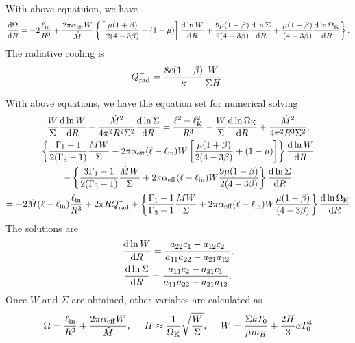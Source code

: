 \documentclass[oneside]{book}
\def\rd{{\rm d}}
\begin{document}
With above equatuion, we have
\begin{gather}
\frac{\rd\Omega}{\rd R}=-2\frac{\ell_{\rm in}}{R^3}+\frac{2\pi\alpha_{\rm eff} W}{\dot M}
\left\{\left[\frac{\mu(1+\beta)}{2(4-3\beta)}+(1-\mu)\right]\frac{\rd\ln W}{\rd R}
+\frac{9\mu(1-\beta)}{2(4-3\beta)}\frac{\rd\ln \Sigma}{\rd R}
+\frac{\mu(1-\beta)}{(4-3\beta)}\frac{\rd\ln \Omega_{\rm K}}{\rd R}
\right\}.
\end{gather}
The radiative cooling is
\begin{equation}
Q_{\rm rad}^-=\frac{8c(1-\beta)}{\kappa}\frac{W}{\Sigma H}.
\end{equation}

With above equations, we have the equation set for numerical solving
\begin{gather}
\frac{W}{\Sigma}\frac{\rd\ln W}{\rd R}-\frac{\dot M^2}{4\pi^2R^2\Sigma^2}\frac{\rd\ln\Sigma}{\rd R}
=\frac{\ell^2-\ell_{\rm K}^2}{R^3}-\frac{W}{\Sigma}\frac{\rd\ln\Omega_{\rm K}}{\rd R}+
\frac{\dot M^2}{4\pi^2R^3\Sigma^2},\\
\left\{ \frac{\Gamma_1+1}{2(\Gamma_3-1)}\frac{\dot MW}{\Sigma}
 -2\pi\alpha_{\rm eff}(\ell-\ell_{\rm in})W\left[\frac{\mu(1+\beta)}{2(4-3\beta)}+(1-\mu)\right]\right\}
\frac{\rd\ln W}{\rd R}\nonumber\\
-\left\{ \frac{3\Gamma_1-1}{2(\Gamma_3-1)}\frac{\dot MW}{\Sigma}
+2\pi\alpha_{\rm eff}(\ell-\ell_{\rm in})W\frac{9\mu(1-\beta)}{2(4-3\beta)}\right\}
\frac{\rd\ln \Sigma}{\rd R}\nonumber\\
=-2\dot M(\ell-\ell_{\rm in})\frac{\ell_{\rm in}}{R^3}+2\pi R Q_{\rm rad}^-
+\left\{\frac{\Gamma_1-1}{\Gamma_3-1}\frac{\dot MW}{\Sigma}
+2\pi\alpha_{\rm eff}(\ell-\ell_{\rm in})W\frac{\mu(1-\beta)}{(4-3\beta)}\right\}
\frac{\rd\ln \Omega_{\rm K}}{\rd R}
\end{gather}
The solutions are
\begin{gather}
\frac{\rd\ln W}{\rd R}=\frac{a_{22}c_1-a_{12}c_2}{a_{11}a_{22}-a_{21}a_{12}},\\
\frac{\rd\ln \Sigma}{\rd R}=\frac{a_{11}c_2-a_{21}c_1}{a_{11}a_{22}-a_{21}a_{12}}.
\end{gather}
Once $W$ and $\Sigma$ are obtained, other variabes are calculated as
\begin{gather}
\Omega=\frac{\ell_{\rm in}}{R^2}+\frac{2\pi\alpha_{\rm eff}W}{\dot M}, ~~~~
H\approx\frac{1}{\Omega_{\rm K}}\sqrt{\frac{W}{\Sigma}},~~~~
W=\frac{\Sigma k T_0}{\bar\mu m_H} + \frac{2H}{3}aT_0^4
\end{gather}
\end{document}
